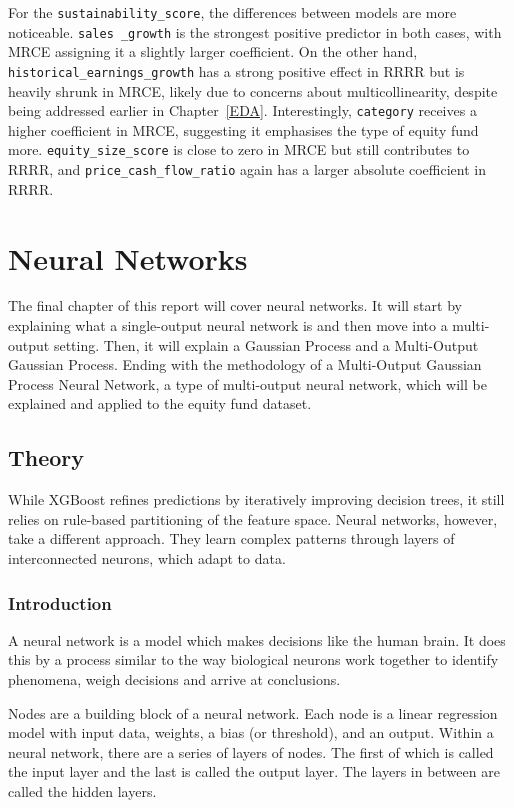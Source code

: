 For the \texttt{sustainability\_score}, the differences between models are more noticeable. \texttt{sales \linebreak\_growth} is the strongest positive predictor in both cases, with MRCE assigning it a slightly larger coefficient. On the other hand, \texttt{historical\_earnings\_growth} has a strong positive effect in RRRR but is heavily shrunk in MRCE, likely due to concerns about multicollinearity, despite being addressed earlier in Chapter~\ref{EDA}. Interestingly, \texttt{category} receives a higher coefficient in MRCE, suggesting it emphasises the type of equity fund more. \texttt{equity\_size\_score} is close to zero in MRCE but still contributes to RRRR, and \texttt{price\_cash\_flow\_ratio} again has a larger absolute coefficient in RRRR.


\chapter{Neural Networks}
The final chapter of this report will cover neural networks. It will start by explaining what a single-output neural network is and then move into a multi-output setting. Then, it will explain a Gaussian Process and a Multi-Output Gaussian Process. Ending with the methodology of a Multi-Output Gaussian Process Neural Network, a type of multi-output neural network, which will be explained and applied to the equity fund dataset.

\section{Theory}
While XGBoost refines predictions by iteratively improving decision trees, it still relies on rule-based partitioning of the feature space. Neural networks, however, take a different approach. They learn complex patterns through layers of interconnected neurons, which adapt to data.

\subsection{Introduction}
A neural network is a model which makes decisions like the human brain. It does this by a process similar to the way biological neurons work together to identify phenomena, weigh decisions and arrive at conclusions.\cite{ibm2024neuralnetworks}

Nodes are a building block of a neural network. Each node is a linear regression model with input data, weights, a bias (or threshold), and an output.\cite{ibm2024neuralnetworks} Within a neural network, there are a series of layers of nodes. The first of which is called the input layer and the last is called the output layer. The layers in between are called the hidden layers.

